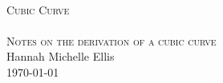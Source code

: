 \begin{titlepage}
\begin{center}
\HRule \\[0.5cm]
\textsc{\huge Cubic Curve}\\[0.5cm]
\HRule \\[0.5cm]
\textsc{\Large Notes on the derivation of a cubic curve}\\[0.5cm]
\vfill
Hannah Michelle Ellis\\[1.0cm]
\today
\end{center}
\end{titlepage}
